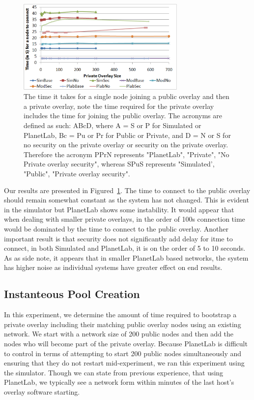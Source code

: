 \documentclass[conference]{IEEEtran}
\begin{document}
\begin{figure}[h]
\centering
\includegraphics[width=3.25in]{single_join.eps}
\caption{The time it takes for a single node joining a public overlay and then
a private overlay, note the time required for the private overlay includes the
time for joining the public overlay.  The acronyms are defined as such:  ABcD,
where A = S or P for Simulated or PlanetLab, Bc = Pu or Pr for Public or Private,
and D = N or S for no security on the private overlay or security on the private
overlay.  Therefore the acronym PPrN represents "PlanetLab", "Private", "No
Private overlay security", whereas SPuS represents "Simulated', "Public",
"Private overlay security".}
\label{fig:single_join}
\end{figure}

Our results are presented in Figured~\ref{fig:single_join}.  The time to
connect to the public overlay should remain somewhat constant as the system
has not changed.  This is evident in the simulator but PlanetLab shows
some instability.  It would appear that when dealing with smaller private
overlays, in the order of 100s connection time would be dominated by the
time to connect to the public overlay.  Another important result is that
security does not significantly add delay for itme to connect, in both
Simulated and PlanetLab, it is on the order of 5 to 10 seconds.  As as side
note, it appears that in smaller PlanetLab based networks, the system has
higher noise as individual systems have greater effect on end results.

\subsection{Instanteous Pool Creation}
In this experiment, we determine the amount of time required to bootstrap a
private overlay including their matching public overlay nodes using an existing
network.  We start with a network size of 200 public nodes and then add the
nodes who will become part of the private overlay.  Because PlanetLab is
difficult to control in terms of attempting to start 200 public nodes
simultaneously and ensuring that they do not restart mid-experiment, we ran
this experiment using the simulator.  Though we can state from previous
experience, that using PlanetLab, we typically see a network form within
minutes of the last host's overlay software starting.
\end{document}
